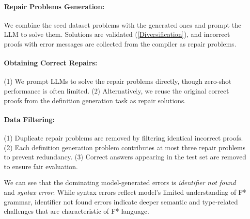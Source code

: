 \paragraph{Repair Problems Generation:} We combine the seed dataset problems with the generated ones and prompt the LLM to solve them. Solutions are validated (\ref{Diversification}), and incorrect proofs with error messages are collected from the compiler as repair problems.

\paragraph{Obtaining Correct Repairs:} (1) We prompt LLMs to solve the repair problems directly, though zero-shot performance is often limited. (2) Alternatively, we reuse the original correct proofs from the definition generation task as repair solutions.

\paragraph{Data Filtering:} (1) Duplicate repair problems are removed by filtering identical incorrect proofs. (2) Each definition generation problem contributes at most three repair problems to prevent redundancy. (3) Correct answers appearing in the test set are removed to ensure fair evaluation.

We can see that the dominating model-generated errors is \textit{identifier not found} and \textit{syntax error}. While syntax errors reflect model's limited understanding of F* grammar, identifier not found errors indicate deeper semantic and type-related challenges that are characteristic of F* language.

\iffalse
\begin{figure}
    \centering
    \texttt{[image: fig/error\_types.pdf]}
    \caption{Distribution of Top 10 Error Types of Model-Generated Repair Data\kexin{if the actual number of the distribution is helpful, maybe use a table - smaller pies here are not very clear which one has higher \%}}
    \label{fig:error-distribution}
\end{figure}
\fi
